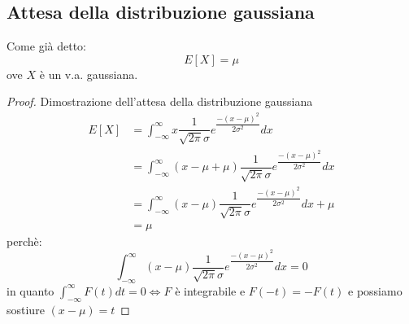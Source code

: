 \documentclass[12pt]{report}
\begin{document}
  	 \subsection{Attesa della distribuzione gaussiana}
  	 Come già detto:
  	 \[
  	 E[X] = \mu
  	 \]
  	 ove $X$ è un v.a. gaussiana.
	 \begin{proof}{Dimostrazione dell'attesa della distribuzione gaussiana} \quad \\
	 	\begin{align*}
	 		E[X] &= \int_{-\infty}^{\infty}x \dfrac{1}{\sqrt{2\pi}\sigma}e^{\dfrac{-(x - \mu)^2}{2\sigma^2}}dx \\
	 		&= \int_{-\infty}^{\infty} (x - \mu + \mu) \dfrac{1}{\sqrt{2\pi}\sigma}e^{\dfrac{-(x - \mu)^2}{2\sigma^2}}dx \\
	 		&= \int_{-\infty}^{\infty} (x - \mu) \dfrac{1}{\sqrt{2\pi}\sigma}e^{\dfrac{-(x - \mu)^2}{2\sigma^2}}dx + \mu \\
	 		&= \mu
	 	\end{align*}
	 	perchè:
	 	\[
	 	\int_{-\infty}^{\infty} (x - \mu) \dfrac{1}{\sqrt{2\pi}\sigma}e^{\dfrac{-(x - \mu)^2}{2\sigma^2}}dx = 0
	 	\]
	 	in quanto $\int_{-\infty}^{\infty}F(t)dt = 0 \iff F$ è integrabile e $F(-t) = -F(t)$ e possiamo sostiure $(x - \mu) = t$
	 \end{proof}
\end{document}
